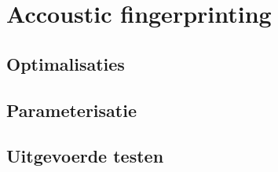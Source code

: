 \chapter{Accoustic fingerprinting}

\section{Optimalisaties}

\section{Parameterisatie}

\section{Uitgevoerde testen}
